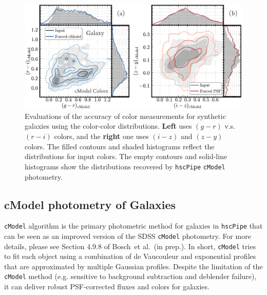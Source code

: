 \documentclass[useamsfonts]{pasj01}
\def\etal{{\ et al.~}}
\def\hscpipe{\texttt{hscPipe}}
\def\cmodel{\texttt{cModel}}
\begin{document}
\begin{figure}
    \begin{center}
        \includegraphics[width=\textwidth]{fig/synpipe_galaxy_cdist}
    \end{center}
    \caption{
        Evaluations of the accuracy of color measurements for synthetic galaxies
        using the color-color distributions.
        \textbf{Left} uses $(g-r)$ v.s. $(r-i)$ colors, and the \textbf{right} one
        uses $(i-z)$ and $(z-y)$ colors.
        The filled contours and shaded histograms reflect the distributions for input
        colors.
        The empty contours and solid-line histograms show the distributions recovered
        by \hscpipe{} \cmodel{} photometry.
        }
    \label{fig:galaxy_cdist}
\end{figure}

\subsection{cModel photometry of Galaxies}
    \label{ssec:cmodel}

    \cmodel{} algorithm is the primary photometric method for galaxies in
    \hscpipe{} that can be seen as an improved version of the SDSS \cmodel{}
    photometry.
    For more details, please see Section 4.9.8 of Bosch\etal (in prep.).
    In short, \cmodel{} tries to fit each object using a combination of de Vaucouleur
    and exponential profiles that are approximated by multiple Gaussian profiles.
    Despite the limitation of the \cmodel{} method (e.g. sensitive to background
    subtraction and deblender failure), it can deliver robust PSF-corrected fluxes and
    colors for galaxies.
\end{document}
